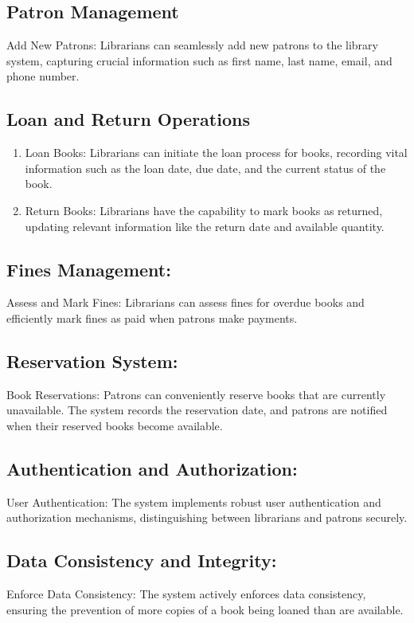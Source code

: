 \documentclass[12pt,titlepage,a4paper]{report}
\begin{document}
\subsection{Patron Management}
\noindent
Add New Patrons: Librarians can seamlessly add new patrons to the library system, capturing crucial information such as first name, last name, email, and phone number.

\subsection{Loan and Return Operations}
\begin{enumerate}
    \item Loan Books: Librarians can initiate the loan process for books, recording vital information such as the loan date, due date, and the current status of the book.
    \item Return Books: Librarians have the capability to mark books as returned, updating relevant information like the return date and available quantity.
\end{enumerate}

\subsection{Fines Management:}
\noindent
Assess and Mark Fines: Librarians can assess fines for overdue books and efficiently mark fines as paid when patrons make payments.

\subsection{Reservation System:}
\noindent
Book Reservations: Patrons can conveniently reserve books that are currently unavailable. The system records the reservation date, and patrons are notified when their reserved books become available.

\subsection{Authentication and Authorization:}
\noindent
User Authentication: The system implements robust user authentication and authorization mechanisms, distinguishing between librarians and patrons securely.

\subsection{Data Consistency and Integrity:}
\noindent
Enforce Data Consistency: The system actively enforces data consistency, ensuring the prevention of more copies of a book being loaned than are available.
\end{document}
